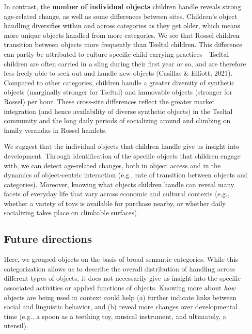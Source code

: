 \documentclass[10pt, letterpaper]{article}
\begin{document}
In contrast, the \textbf{number of individual objects} children handle
reveals strong age-related change, as well as some differences between
sites. Children's object handling diversifies within and across
categories as they get older, which means more unique objects handled
from more categories. We see that Rossel children transition between
objects more frequently than Tseltal children. This difference can
partly be attributed to culture-specific child carrying
practices---Tseltal children are often carried in a sling during their
first year or so, and are therefore less freely able to seek out and
handle new objects (Casillas \& Elliott, 2021). Compared to other
categories, children handle a greater diversity of synthetic objects
(marginally stronger for Tseltal) and immovable objects (stronger for
Rossel) per hour. These cross-site differences reflect the greater
market integration (and hence availability of diverse synthetic objects)
in the Tseltal community and the long daily periods of socializing
around and climbing on family verandas in Rossel hamlets.

We suggest that the individual objects that children handle give us
insight into development. Through identification of the specific objects
that children engage with, we can detect age-related changes, both in
object access and in the dynamics of object-centric interaction (e.g.,
rate of transition between objects and categories). Moreover, knowing
what objects children handle can reveal many facets of everyday life
that vary across economic and cultural contexts (e.g., whether a variety
of toys is available for purchase nearby, or whether daily socializing
takes place on climbable surfaces).

\hypertarget{future-directions}{%
\subsection{Future directions}\label{future-directions}}

Here, we grouped objects on the basis of broad semantic categories.
While this categorization allows us to describe the overall distribution
of handling across different types of objects, it does not necessarily
give us insight into the specific associated activities or applied
functions of objects. Knowing more about \emph{how} objects are being
used in context could help (a) further indicate links between social and
linguistic behavior, and (b) reveal more changes over developmental time
(e.g., a spoon as a teething toy, musical instrument, and ultimately, a
utensil).
\end{document}
